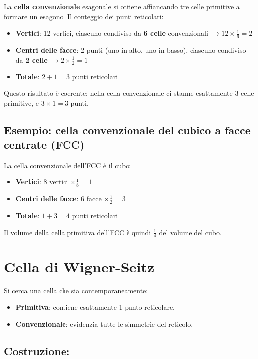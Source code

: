 La \textbf{cella convenzionale} esagonale si ottiene affiancando tre celle primitive a formare un esagono. Il conteggio dei punti reticolari:

\begin{itemize}
    \item \textbf{Vertici}: 12 vertici, ciascuno condiviso da \textbf{6 celle} convenzionali $\to 12 \times \frac{1}{6} = 2$
    \item \textbf{Centri delle facce}: 2 punti (uno in alto, uno in basso), ciascuno condiviso da \textbf{2 celle} $\to 2 \times \frac{1}{2} = 1$
    \item \textbf{Totale}: $2 + 1 = 3$ punti reticolari
\end{itemize}

Questo risultato è coerente: nella cella convenzionale ci stanno esattamente 3 celle primitive, e $3 \times 1 = 3$ punti.

\subsection*{Esempio: cella convenzionale del cubico a facce centrate (FCC)}

La cella convenzionale dell'FCC è il cubo:

\begin{itemize}
    \item \textbf{Vertici}: 8 vertici $\times \frac{1}{8} = 1$
    \item \textbf{Centri delle facce}: 6 facce $\times \frac{1}{2} = 3$
    \item \textbf{Totale}: $1 + 3 = 4$ punti reticolari
\end{itemize}

Il volume della cella primitiva dell'FCC è quindi $\frac{1}{4}$ del volume del cubo.

\section{Cella di Wigner-Seitz}

Si cerca una cella che sia contemporaneamente:
\begin{itemize}
    \item \textbf{Primitiva}: contiene esattamente 1 punto reticolare.
    \item \textbf{Convenzionale}: evidenzia tutte le simmetrie del reticolo.
\end{itemize}

\subsection*{Costruzione:}

